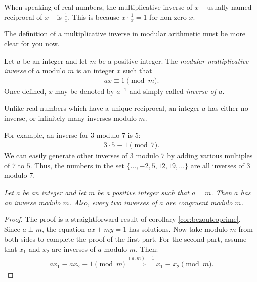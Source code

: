 \documentclass{subfile}
\begin{document}
	When speaking of real numbers, the multiplicative inverse of $x$ -- usually named reciprocal of $x$ -- is $\frac{1}{x}$. This is because $x \cdot \frac{1}{x} = 1$ for non-zero $x$.
	
	The definition of a multiplicative inverse in modular arithmetic must be more clear for you now.
	
	\begin{definition}
		Let $a$ be an integer and let $m$ be a positive integer. The \textit{modular multiplicative inverse} of $a$ modulo $m$ is an integer $x$ such that
		\begin{align*}
		ax \equiv 1 \pmod m.
		\end{align*}
		Once defined, $x$ may be denoted by $a^{-1}$ and simply called \textit{inverse of $a$}.
	\end{definition}
	
	\begin{note}
		Unlike real numbers which have a unique reciprocal, an integer $a$ has either no inverse, or infinitely many inverses modulo $m$.
	\end{note}
	
	For example, an inverse for $3$ modulo $7$ is $5$:
	\begin{align*}
	3 \cdot 5 \equiv 1 \pmod 7.
	\end{align*}
	We can easily generate other inverses of $3$ modulo $7$ by adding various multiples of $7$ to $5$. Thus, the numbers in the set $\{\ldots, -2, 5, 12, 19, \ldots \}$ are all inverses of $3$ modulo $7$.
	
	\begin{theorem} \label{thm:arithinverse} \slshape
		Let $a$ be an integer and let $m$ be a positive integer such that $a \perp m$. Then $a$ has an inverse modulo $m$. Also, every two inverses of $a$ are congruent modulo $m$.
	\end{theorem}
	
	\begin{proof}
		The proof is a straightforward result of corollary \eqref{cor:bezoutcoprime}. Since $a \perp m$, the equation $ax+my=1$ has solutions. Now take modulo $m$ from both sides to complete the proof of the first part. For the second part, assume that $x_1$ and $x_2$ are inverses of $a$ modulo $m$. Then:
		\begin{align*}
		ax_1 \equiv ax_2 \equiv 1 \pmod m \stackrel{(a,m)=1}{\implies} x_1 \equiv x_2 \pmod m.
		\end{align*}
		
	\end{proof}
	
\end{document}
